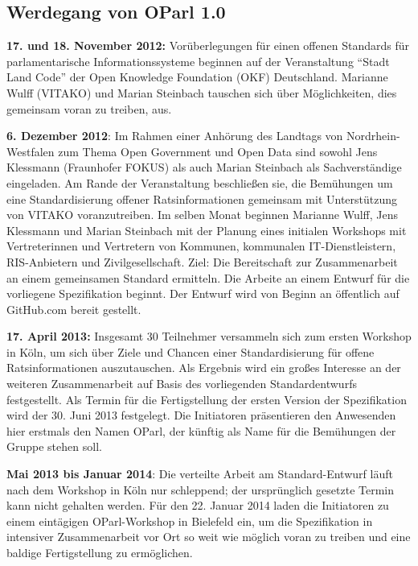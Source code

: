 \documentclass[,a4paper]{article}
\begin{document}
\subsection{Werdegang von OParl 1.0}\label{werdegang-von-oparl-1.0}

\textbf{17. und 18. November 2012:} Vorüberlegungen für einen offenen
Standards für parlamentarische Informationssysteme beginnen auf der
Veranstaltung ``Stadt Land Code'' der Open Knowledge Foundation (OKF)
Deutschland. Marianne Wulff (VITAKO) und Marian Steinbach tauschen sich
über Möglichkeiten, dies gemeinsam voran zu treiben, aus.

\textbf{6. Dezember 2012}: Im Rahmen einer Anhörung des Landtags von
Nordrhein-Westfalen zum Thema Open Government und Open Data sind sowohl
Jens Klessmann (Fraunhofer FOKUS) als auch Marian Steinbach als
Sachverständige eingeladen. Am Rande der Veranstaltung beschließen sie,
die Bemühungen um eine Standardisierung offener Ratsinformationen
gemeinsam mit Unterstützung von VITAKO voranzutreiben. Im selben Monat
beginnen Marianne Wulff, Jens Klessmann und Marian Steinbach mit der
Planung eines initialen Workshops mit Vertreterinnen und Vertretern von
Kommunen, kommunalen IT-Dienstleistern, RIS-Anbietern und
Zivilgesellschaft. Ziel: Die Bereitschaft zur Zusammenarbeit an einem
gemeinsamen Standard ermitteln. Die Arbeite an einem Entwurf für die
vorliegene Spezifikation beginnt. Der Entwurf wird von Beginn an
öffentlich auf GitHub.com bereit gestellt.

\textbf{17. April 2013:} Insgesamt 30 Teilnehmer versammeln sich zum
ersten Workshop in Köln, um sich über Ziele und Chancen einer
Standardisierung für offene Ratsinformationen auszutauschen. Als
Ergebnis wird ein großes Interesse an der weiteren Zusammenarbeit auf
Basis des vorliegenden Standardentwurfs festgestellt. Als Termin für die
Fertigstellung der ersten Version der Spezifikation wird der 30. Juni
2013 festgelegt. Die Initiatoren präsentieren den Anwesenden hier
erstmals den Namen OParl, der künftig als Name für die Bemühungen der
Gruppe stehen soll.

\textbf{Mai 2013 bis Januar 2014}: Die verteilte Arbeit am
Standard-Entwurf läuft nach dem Workshop in Köln nur schleppend; der
ursprünglich gesetzte Termin kann nicht gehalten werden. Für den 22.
Januar 2014 laden die Initiatoren zu einem eintägigen OParl-Workshop in
Bielefeld ein, um die Spezifikation in intensiver Zusammenarbeit vor Ort
so weit wie möglich voran zu treiben und eine baldige Fertigstellung zu
ermöglichen.
\end{document}
